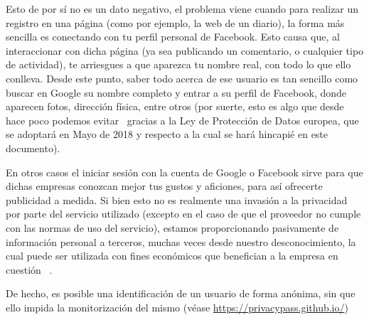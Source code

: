 Esto de por sí no es un dato negativo, el problema viene cuando para
realizar un registro en una página (como por ejemplo, la web de un
diario), la forma más sencilla es conectando con tu perfil personal de
Facebook. Esto causa que, al interaccionar con dicha página (ya sea
publicando un comentario, o cualquier tipo de actividad), te
arriesgues a que aparezca tu nombre real, con todo lo que ello
conlleva. Desde este punto, saber todo acerca de ese usuario es tan
sencillo como buscar en Google su nombre completo y entrar a su perfil
de Facebook, donde aparecen fotos, dirección física, entre otros (por
suerte, esto es algo que desde hace poco podemos
evitar~\cite{article:GDPRGoogle} gracias a la
Ley de Protección de Datos europea, que se adoptará en Mayo de 2018 y respecto a la cual se hará hincapié en este
documento).

En otros casos el iniciar sesión con la cuenta de Google o Facebook
sirve para que dichas empresas conozcan mejor tus gustos y aficiones,
para así ofrecerte publicidad a medida. Si bien esto no es realmente una invasión a la privacidad por parte del servicio utilizado (excepto en el caso de que el proveedor no cumple con las normas de uso del servicio), estamos proporcionando pasivamente de información personal a terceros, muchas veces desde nuestro desconocimiento, la cual puede ser utilizada con fines económicos que benefician a la empresa en cuestión ~\cite{article:compraventa}. 

De hecho, es posible una identificación de un usuario de forma anónima, sin que ello impida la monitorización del mismo (véase \url{https://privacypass.github.io/})


